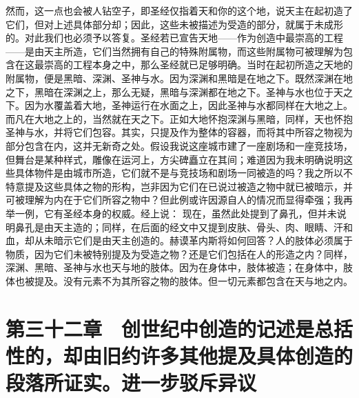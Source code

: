 然而，这一点也会被人钻空子，即圣经仅指着天和你的这个地，说天主在起初造了它们，但对上述具体部分却；因此，这些未被描述为受造的部分，就属于未成形的。对此我们也必须予以答复。圣经若已宣告天地——作为创造中最崇高的工程——是由天主所造，它们当然拥有自己的特殊附属物，而这些附属物可被理解为包含在这最崇高的工程本身之中，那么圣经就已足够明确。当时在起初所造之天地的附属物，便是黑暗、深渊、圣神与水。因为深渊和黑暗是在地之下。既然深渊在地之下，黑暗在深渊之上，那么无疑，黑暗与深渊都在地之下。圣神与水也位于天之下。因为水覆盖着大地，圣神运行在水面之上，因此圣神与水都同样在大地之上。而凡在大地之上的，当然就在天之下。正如大地怀抱深渊与黑暗，同样，天也怀抱圣神与水，并将它们包容。其实，只提及作为整体的容器，而将其中所容之物视为部分包含在内，这并无新奇之处。假设我说这座城市建了一座剧场和一座竞技场，但舞台是某种样式，雕像在运河上，方尖碑矗立在其间；难道因为我未明确说明这些具体物件是由城市所造，它们就不是与竞技场和剧场一同被造的吗？我之所以不特意提及这些具体之物的形构，岂非因为它们在已说过被造之物中就已被暗示，并可被理解为内在于它们所容之物中？但此例或许因源自人的情况而显得牵强；我再举一例，它有圣经本身的权威。经上说： 现在，虽然此处提到了鼻孔，但并未说明鼻孔是由天主造的；同样，在后面的经文中又提到皮肤、骨头、肉、眼睛、汗和血，却从未暗示它们是由天主创造的。赫谟革内斯将如何回答？人的肢体必须属于物质，因为它们未被特别提及为受造之物？还是它们包括在人的形造之内？同样，深渊、黑暗、圣神与水也天与地的肢体。因为在身体中，肢体被造；在身体中，肢体也被提及。没有元素不为其所容之物的肢体。但一切元素都包含在天与地之内。\par


\section{第三十二章　创世纪中创造的记述是总括性的，却由旧约许多其他提及具体创造的段落所证实。进一步驳斥异议}

